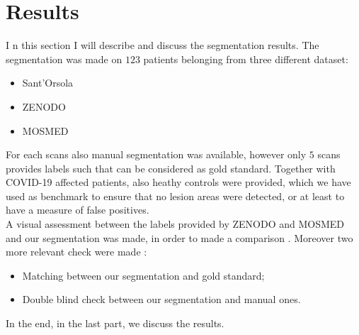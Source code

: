\documentclass{standalone}
\begin{document}
	
	\section{Results}
	
	I n this section I will describe and discuss the segmentation results. The segmentation was made on $123$ patients belonging from three different dataset: 
	\begin{itemize}
		\item Sant'Orsola
		
		\item ZENODO~\cite{DATA:ZENODO}
		
		\item MOSMED~\cite{DATA:MOSMED}
	\end{itemize}

	For each scans also manual segmentation was available, however only $5$ scans provides labels such that can be considered as gold standard. Together with COVID-19 affected patients, also heathy controls were provided, which we have used as benchmark to ensure that no lesion areas were detected, or at least to have a measure of false positives.\\
	A visual assessment between the labels provided by ZENODO and MOSMED and our segmentation was made, in order to made a comparison . Moreover two more relevant check were made : 
	\begin{itemize}
		\item Matching between our segmentation and gold standard; 
		
		\item Double blind check between our segmentation and manual ones.		
	\end{itemize}

	In the end, in the last part, we discuss the results.
\end{document}
